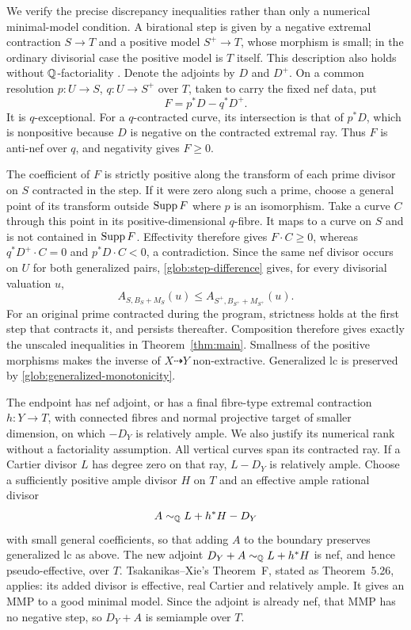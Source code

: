 We verify the precise discrepancy inequalities rather than only a
numerical minimal-model condition.  A birational step is given by a
negative extremal contraction $S\to T$ and a positive model
$S^+\to T$, whose morphism is small; in the ordinary divisorial case the
positive model is $T$ itself.  This description also holds without
$\mathbb Q$-factoriality \cite[Remark~2.15]{TsakanikasXie}.  Denote the adjoints
by $D$ and $D^+$.  On a common resolution $p:U\to S$, $q:U\to S^+$ over
$T$, taken to carry the fixed nef data, put
\begin{equation}\label{glob:step-difference}
 F=p^*D-q^*D^+.
\end{equation}
It is $q$-exceptional.  For a $q$-contracted curve, its intersection is
that of $p^*D$, which is nonpositive because $D$ is negative on the
contracted extremal ray.  Thus $F$ is anti-nef over $q$, and negativity
gives $F\geq0$.

The coefficient of $F$ is strictly positive along the transform of each
prime divisor on $S$ contracted in the step.  If it were zero along such
a prime, choose a general point of its transform outside $\operatorname{Supp} F$
where $p$ is an isomorphism. Take a curve $C$ through this point in its
positive-dimensional $q$-fibre. It maps to a curve on $S$ and
is not contained in $\operatorname{Supp} F$. Effectivity therefore gives
$F\cdot C\geq0$, whereas $q^*D^+\cdot C=0$ and
$p^*D\cdot C<0$, a contradiction.  Since the same nef divisor occurs on
$U$ for both generalized pairs, \eqref{glob:step-difference} gives,
for every divisorial valuation $u$,
\begin{equation}\label{glob:generalized-monotonicity}
 A_{S,B_S+M_S}(u)\leq A_{S^+,B_{S^+}+M_{S^+}}(u).
\end{equation}
For an original prime contracted during the program, strictness holds at
the first step that contracts it, and persists thereafter.  Composition
therefore gives exactly the unscaled inequalities in
Theorem~\ref{thm:main}.  Smallness of the positive morphisms makes the
inverse of $X\dashrightarrow Y$ non-extractive.  Generalized lc is
preserved by \eqref{glob:generalized-monotonicity}.

The endpoint has nef adjoint, or has a final fibre-type extremal
contraction $h:Y\to T$, with connected fibres and normal projective
target of smaller dimension, on which $-D_Y$ is relatively ample.
We also justify its numerical rank without a factoriality assumption.
All vertical curves span its contracted ray.  If a Cartier divisor $L$
has degree zero on that ray, $L-D_Y$ is relatively ample.  Choose a
sufficiently positive ample divisor $H$ on $T$ and an effective ample
rational divisor
\[
 A\sim_\mathbb Q L+h^*H-D_Y
\]
with small general coefficients, so that adding $A$ to the boundary
preserves generalized lc as above.  The new adjoint
$D_Y+A\sim_\mathbb Q L+h^*H$ is nef, and hence pseudo-effective, over $T$.
Tsakanikas--Xie's Theorem~F, stated as Theorem~5.26, applies: its added
divisor is effective, real Cartier and relatively ample.  It gives an
MMP to a good minimal model.  Since the adjoint is already nef, that MMP
has no negative step, so $D_Y+A$ is semiample over $T$.

